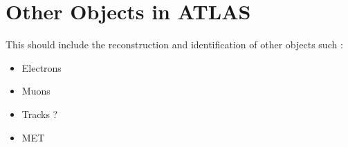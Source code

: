 \newpage
\chapter{Other Objects in ATLAS}
\label{obj}

This should include the reconstruction and identification of other objects such :
\begin{itemize}
    \item Electrons 
    \item Muons 
    \item Tracks ?
    \item MET
\end{itemize}